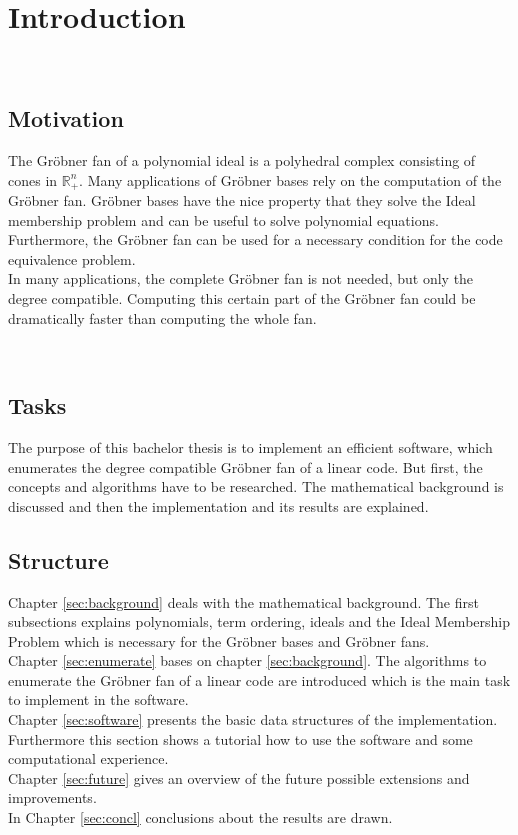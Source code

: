 \section{Introduction}

~\\
\subsection{Motivation}
The Gröbner fan of a polynomial ideal is a polyhedral complex consisting of cones in $\mathbb{R}_{+}^{n}$.
Many applications of Gröbner bases rely on the computation of the Gröbner fan.
Gröbner bases have the nice property that they solve the Ideal membership problem and can be useful to solve polynomial equations.
Furthermore, the Gröbner fan can be used for a necessary condition for the code equivalence problem. \\
In many applications, the complete Gröbner fan is not needed, but only the degree compatible. 
Computing this certain part of the Gröbner fan could be dramatically faster than computing the whole fan.

~\\

\subsection{Tasks}
The purpose of this bachelor thesis is to implement an efficient software, which enumerates the degree compatible Gröbner fan of a linear code. But first, the concepts and algorithms have to be researched. The mathematical background is discussed and then the implementation and its results are explained. 

\newpage

\subsection{Structure}
Chapter \ref{sec:background} deals with the mathematical background. The first subsections explains polynomials, term ordering, ideals and the Ideal Membership Problem which is necessary for the Gröbner bases and Gröbner fans. \\
Chapter \ref{sec:enumerate} bases on chapter \ref{sec:background}. The algorithms to enumerate the Gröbner fan of a linear code are introduced which is the main task to implement in the software.\\
Chapter \ref{sec:software} presents the basic data structures of the implementation. Furthermore this section shows a tutorial how to use the software and some computational experience.\\
Chapter \ref{sec:future} gives an overview of the future possible extensions and improvements.\\
In Chapter \ref{sec:concl} conclusions about the results are drawn.
\newpage
